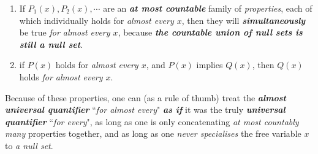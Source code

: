 \documentclass[11pt]{article}
\begin{document}
\begin{itemize}
\begin{remark}
\begin{enumerate}
\item If $P_{1}(x), P_{2}(x), \cdots$ are an \emph{\textbf{at most countable}} family of \emph{properties}, each of which individually holds
for \emph{almost every $x$}, then they will \emph{\textbf{simultaneously}} be true \emph{for almost every $x$}, because \emph{\textbf{the countable union of null sets is still a null set}}.

\item  if $P(x)$ holds for \emph{almost every $x$}, and $P(x)$ implies $Q(x)$, then $Q(x)$ holds \emph{for almost every $x$}.
\end{enumerate}

Because of these properties, one can (as a rule of thumb) treat the \emph{\textbf{almost universal quantifier}} ``\emph{for almost every}" \emph{\textbf{as if}} it was the truly \emph{\textbf{universal quantifier}} ``\emph{for every}", as long as one is only concatenating \emph{at most countably many} properties together, and as long as one \emph{never specialises} the free variable $x$ to \emph{a null set}.
\end{remark}


\end{itemize}
\end{document}
